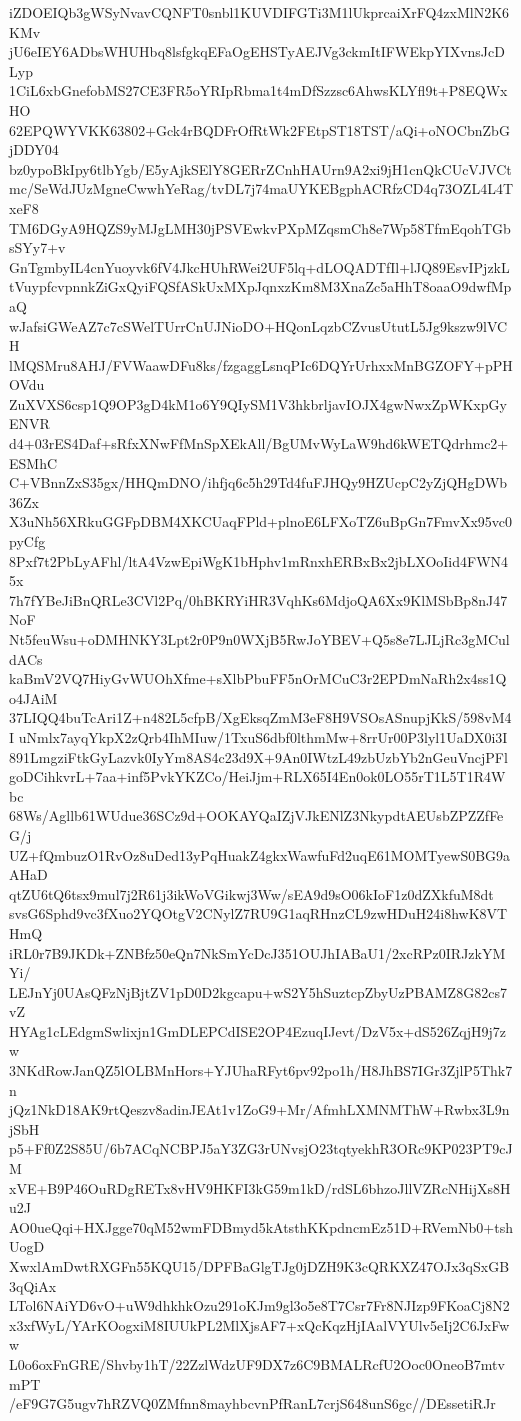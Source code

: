 iZDOEIQb3gWSyNvavCQNFT0snbl1KUVDIFGTi3M1lUkprcaiXrFQ4zxMlN2K6KMv
jU6eIEY6ADbsWHUHbq8lsfgkqEFaOgEHSTyAEJVg3ckmItIFWEkpYIXvnsJcDLyp
1CiL6xbGnefobMS27CE3FR5oYRIpRbma1t4mDfSzzsc6AhwsKLYfl9t+P8EQWxHO
62EPQWYVKK63802+Gck4rBQDFrOfRtWk2FEtpST18TST/aQi+oNOCbnZbGjDDY04
bz0ypoBkIpy6tlbYgb/E5yAjkSElY8GERrZCnhHAUrn9A2xi9jH1cnQkCUcVJVCt
mc/SeWdJUzMgneCwwhYeRag/tvDL7j74maUYKEBgphACRfzCD4q73OZL4L4TxeF8
TM6DGyA9HQZS9yMJgLMH30jPSVEwkvPXpMZqsmCh8e7Wp58TfmEqohTGbsSYy7+v
GnTgmbyIL4cnYuoyvk6fV4JkcHUhRWei2UF5lq+dLOQADTfIl+lJQ89EsvIPjzkL
tVuypfcvpnnkZiGxQyiFQSfASkUxMXpJqnxzKm8M3XnaZc5aHhT8oaaO9dwfMpaQ
wJafsiGWeAZ7c7cSWelTUrrCnUJNioDO+HQonLqzbCZvusUtutL5Jg9kszw9lVCH
lMQSMru8AHJ/FVWaawDFu8ks/fzgaggLsnqPIc6DQYrUrhxxMnBGZOFY+pPHOVdu
ZuXVXS6csp1Q9OP3gD4kM1o6Y9QIySM1V3hkbrljavIOJX4gwNwxZpWKxpGyENVR
d4+03rES4Daf+sRfxXNwFfMnSpXEkAll/BgUMvWyLaW9hd6kWETQdrhmc2+ESMhC
C+VBnnZxS35gx/HHQmDNO/ihfjq6c5h29Td4fuFJHQy9HZUcpC2yZjQHgDWb36Zx
X3uNh56XRkuGGFpDBM4XKCUaqFPld+plnoE6LFXoTZ6uBpGn7FmvXx95vc0pyCfg
8Pxf7t2PbLyAFhl/ltA4VzwEpiWgK1bHphv1mRnxhERBxBx2jbLXOoIid4FWN45x
7h7fYBeJiBnQRLe3CVl2Pq/0hBKRYiHR3VqhKs6MdjoQA6Xx9KlMSbBp8nJ47NoF
Nt5feuWsu+oDMHNKY3Lpt2r0P9n0WXjB5RwJoYBEV+Q5s8e7LJLjRc3gMCuldACs
kaBmV2VQ7HiyGvWUOhXfme+sXlbPbuFF5nOrMCuC3r2EPDmNaRh2x4ss1Qo4JAiM
37LIQQ4buTcAri1Z+n482L5cfpB/XgEksqZmM3eF8H9VSOsASnupjKkS/598vM4I
uNmlx7ayqYkpX2zQrb4IhMIuw/1TxuS6dbf0lthmMw+8rrUr00P3lyl1UaDX0i3I
891LmgziFtkGyLazvk0IyYm8AS4c23d9X+9An0IWtzL49zbUzbYb2nGeuVncjPFl
goDCihkvrL+7aa+inf5PvkYKZCo/HeiJjm+RLX65I4En0ok0LO55rT1L5T1R4Wbc
68Ws/Agllb61WUdue36SCz9d+OOKAYQaIZjVJkENlZ3NkypdtAEUsbZPZZfFeG/j
UZ+fQmbuzO1RvOz8uDed13yPqHuakZ4gkxWawfuFd2uqE61MOMTyewS0BG9aAHaD
qtZU6tQ6tsx9mul7j2R61j3ikWoVGikwj3Ww/sEA9d9sO06kIoF1z0dZXkfuM8dt
svsG6Sphd9vc3fXuo2YQOtgV2CNylZ7RU9G1aqRHnzCL9zwHDuH24i8hwK8VTHmQ
iRL0r7B9JKDk+ZNBfz50eQn7NkSmYcDcJ351OUJhIABaU1/2xcRPz0IRJzkYMYi/
LEJnYj0UAsQFzNjBjtZV1pD0D2kgcapu+wS2Y5hSuztcpZbyUzPBAMZ8G82cs7vZ
HYAg1cLEdgmSwlixjn1GmDLEPCdISE2OP4EzuqIJevt/DzV5x+dS526ZqjH9j7zw
3NKdRowJanQZ5lOLBMnHors+YJUhaRFyt6pv92po1h/H8JhBS7IGr3ZjlP5Thk7n
jQz1NkD18AK9rtQeszv8adinJEAt1v1ZoG9+Mr/AfmhLXMNMThW+Rwbx3L9njSbH
p5+Ff0Z2S85U/6b7ACqNCBPJ5aY3ZG3rUNvsjO23tqtyekhR3ORc9KP023PT9cJM
xVE+B9P46OuRDgRETx8vHV9HKFI3kG59m1kD/rdSL6bhzoJllVZRcNHijXs8Hu2J
AO0ueQqi+HXJgge70qM52wmFDBmyd5kAtsthKKpdncmEz51D+RVemNb0+tshUogD
XwxlAmDwtRXGFn55KQU15/DPFBaGlgTJg0jDZH9K3cQRKXZ47OJx3qSxGB3qQiAx
LTol6NAiYD6vO+uW9dhkhkOzu291oKJm9gl3o5e8T7Csr7Fr8NJIzp9FKoaCj8N2
x3xfWyL/YArKOogxiM8IUUkPL2MlXjsAF7+xQcKqzHjIAalVYUlv5eIj2C6JxFww
L0o6oxFnGRE/Shvby1hT/22ZzlWdzUF9DX7z6C9BMALRcfU2Ooc0OneoB7mtvmPT
/eF9G7G5ugv7hRZVQ0ZMfnn8mayhbcvnPfRanL7crjS648unS6gc//DEssetiRJr
